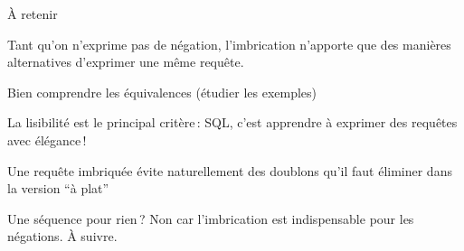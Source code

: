 \begin{frame}{À retenir}

Tant qu'on n'exprime pas de \alert{négation}, l'imbrication
n'apporte que des manières alternatives d'exprimer une même requête.
\vfill

\begin{redbullet}
 \item Bien comprendre les équivalences (étudier les exemples)
  \item La lisibilité est le principal critère\,: SQL, c'est apprendre
    à  exprimer des requêtes avec élégance\,!
  \item Une requête imbriquée évite naturellement des doublons
      qu'il faut éliminer dans la version ``à plat''
\end{redbullet}

\vfill

Une séquence pour rien\,? Non car l'imbrication est indispensable
pour les \alert{négations}. À suivre.
\end{frame}

